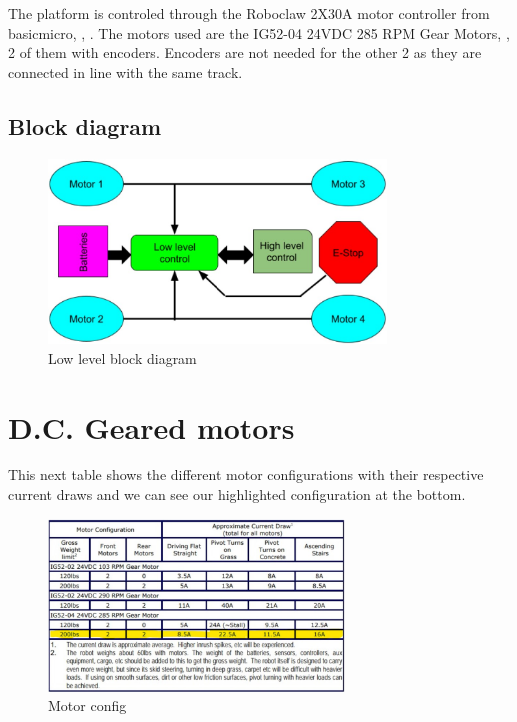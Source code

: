 \documentclass[12pt,letterpaper,oneside]{article}
\begin{document}
The platform is controled through the Roboclaw 2X30A motor controller from basicmicro, \cite{Roboclaw}, \cite{RoboclawData,RoboclawManual}. The motors used are the IG52-04 24VDC 285 RPM Gear Motors, \cite{EncMotors,RegMotors}, 2 of them with encoders. Encoders are not needed for the other 2 as they are connected in line with the same track.

\subsection{Block diagram}

\begin{figure}[h]
    \centering
    \includegraphics[width=0.8\textwidth]{figures/blockDiagram.png}
    \caption{Low level block diagram}
    \label{fig:blockl}
\end{figure}


\newpage
\section{D.C. Geared motors}

This next table shows the different motor configurations with their respective current draws and we can see our highlighted configuration at the bottom.

\begin{figure}[h]
    \centering
    \includegraphics[width=0.7\textwidth]{figures/motorSpecs.jpg}
    \caption{Motor config}
    \label{fig:motorConfig}
\end{figure}
\end{document}
